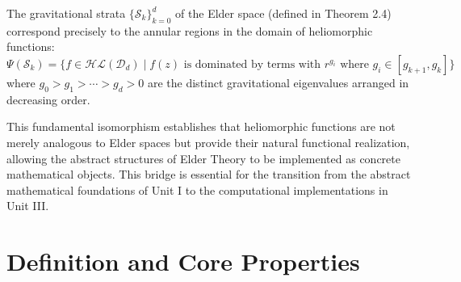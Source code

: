 \begin{theorem}
\label{thm:strata_correspondence}
The gravitational strata $\{\mathcal{S}_k\}_{k=0}^{d}$ of the Elder space (defined in Theorem 2.4) correspond precisely to the annular regions in the domain of heliomorphic functions:
\begin{equation}
\Psi(\mathcal{S}_k) = \{f \in \mathcal{HL}(\mathcal{D}_d) \mid f(z) \text{ is dominated by terms with } r^{g_i} \text{ where } g_i \in [g_{k+1}, g_k]\}
\end{equation}
where $g_0 > g_1 > \cdots > g_d > 0$ are the distinct gravitational eigenvalues arranged in decreasing order.
\end{theorem}

This fundamental isomorphism establishes that heliomorphic functions are not merely analogous to Elder spaces but provide their natural functional realization, allowing the abstract structures of Elder Theory to be implemented as concrete mathematical objects. This bridge is essential for the transition from the abstract mathematical foundations of Unit I to the computational implementations in Unit III.

\section{Definition and Core Properties}

